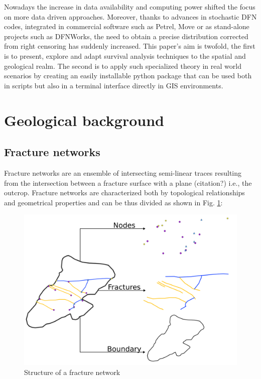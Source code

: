 \documentclass[11pt]{article}
\newcommand{\reffig}[1]{Fig. \ref{#1}}
\begin{document}
		Nowadays the increase in data availability and computing power shifted the focus on more data driven approaches. Moreover, thanks to advances in stochastic DFN codes, integrated in commercial software such as Petrel, Move or as stand-alone projects such as DFNWorks, the need to obtain a precise distribution corrected from right censoring has suddenly increased.
		This paper's aim is twofold, the first is to present, explore and adapt survival analysis techniques to the spatial and geological realm. The second is to apply such specialized theory in real world scenarios by creating an easily installable python package that can be used both in scripts but also in a terminal interface directly in GIS environments.
		
	\section{Geological background}
	
	\subsection{Fracture networks}
	
	Fracture networks are an ensemble of intersecting semi-linear traces resulting from the intersection between a fracture surface with a plane (citation?) i.e., the outcrop. Fracture networks are characterized both by topological relationships and geometrical properties \parencite{nybergNetworkGTGISTool2018} and can be thus divided as shown in \reffig{fig: fn_struct}:
	
	
	\begin{figure}
		\includegraphics[width=\textwidth]{images/frac_net.png}
		\caption{Structure of a fracture network}\label{fig: fn_struct}
	\end{figure}
	
\end{document}
